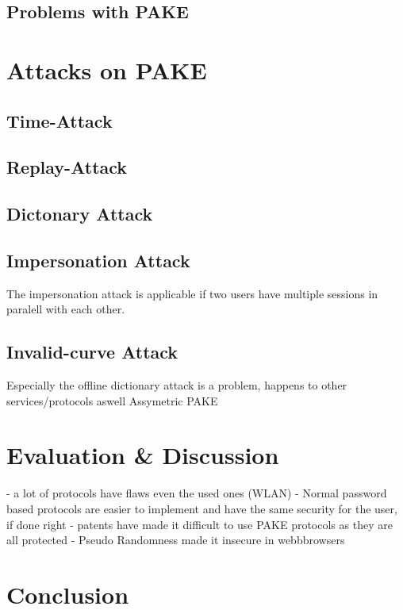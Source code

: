 \documentclass[journal]{IEEEtran}
\begin{document}
\subsection{Problems with PAKE}

\section{Attacks on PAKE}

\subsection{Time-Attack}
\subsection{Replay-Attack}
\subsection{Dictonary Attack}
\subsection{Impersonation Attack}
The impersonation attack is applicable if two users have multiple sessions in paralell with each other.
\subsection{Invalid-curve Attack}

Especially the offline dictionary attack is a problem, happens to other services/protocols aswell
Assymetric PAKE

\section{Evaluation \& Discussion}
- a lot of protocols have flaws even the used ones (WLAN)
- Normal password based protocols are easier to implement and have the same security for the user, if done right
- patents have made it difficult to use PAKE protocols as they are all protected
- Pseudo Randomness made it insecure in webbbrowsers

\section{Conclusion}


\end{document}
